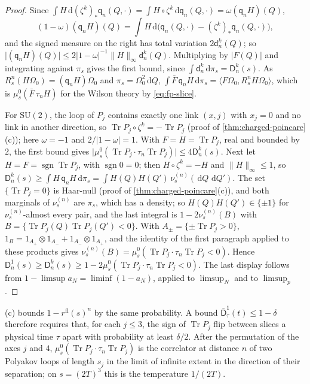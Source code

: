 \documentclass[11pt,a4paper]{amsart}
\theoremstyle{definition}
\theoremstyle{remark}
\numberwithin{equation}{section}
\DeclareMathOperator{\Tr}{Tr}        %
\newcommand{\ip}[2]{\langle #1,#2\rangle}  %
\newcommand{\norm}[1]{\lVert #1\rVert}     %
\newcommand{\abs}[1]{\lvert #1\rvert}      %
\newcommand{\dd}{\,\mathrm{d}}             %
\newcommand{\SU}{\mathrm{SU}}              %
\newcommand{\cube}[1]{(2#1)^3}             %
\newcommand{\Omegazero}{\Omega_0}          %
\begin{document}
\begin{proof}
Since $\int H\dd(\zeta^k)_*\mathsf q_n(Q,\cdot)=\int H\circ\zeta^k\dd\mathsf q_n(Q,\cdot)=\omega(\mathsf q_nH)(Q)$,
\[
(1-\omega)(\mathsf q_nH)(Q)=\int H\dd\bigl(\mathsf q_n(Q,\cdot)-(\zeta^k)_*\mathsf q_n(Q,\cdot)\bigr),
\]
and the signed measure on the right has total variation $2\mathsf d^k_n(Q)$; so $\abs{(\mathsf q_nH)(Q)}\le2\abs{1-\omega}^{-1}\norm H_\infty\mathsf d^k_n(Q)$. Multiplying by $\abs{F(Q)}$ and integrating against $\pi_s$ gives the first bound, since $\int\mathsf d^k_n\dd\pi_s=\mathsf D^k_n(s)$. As $R_s^n(H\Omegazero)=(\mathsf q_nH)\Omegazero$ and $\pi_s=\Omegazero^2\dd Q$, $\int\bar F\,\mathsf q_nH\dd\pi_s=\ip{F\Omegazero}{R_s^nH\Omegazero}$, which is $\mu^0_s(\bar F\,\tau_nH)$ for the Wilson theory by \eqref{eq:fp-slice}.

For $\SU(2)$, the loop of $P_j$ contains exactly one link $(x,j)$ with $x_j=0$ and no link in another direction, so $\Tr P_j\circ\zeta^k=-\Tr P_j$ (proof of \cref{thm:charged-poincare}\textup{(c)}); here $\omega=-1$ and $2/\abs{1-\omega}=1$. With $F=H=\Tr P_j$, real and bounded by $2$, the first bound gives $\abs{\mu^0_s(\Tr P_j\cdot\tau_n\Tr P_j)}\le4\mathsf D^k_n(s)$. Next let $H=F=\operatorname{sgn}\Tr P_j$, with $\operatorname{sgn}0=0$; then $H\circ\zeta^k=-H$ and $\norm H_\infty\le1$, so $\mathsf D^k_n(s)\ge\int H\,\mathsf q_nH\dd\pi_s=\int H(Q)H(Q')\,\nu^{(n)}_s(\dd Q\,\dd Q')$. The set $\{\Tr P_j=0\}$ is Haar-null (proof of \cref{thm:charged-poincare}\textup{(c)}), and both marginals of $\nu^{(n)}_s$ are $\pi_s$, which has a density; so $H(Q)H(Q')\in\{\pm1\}$ for $\nu^{(n)}_s$-almost every pair, and the last integral is $1-2\nu^{(n)}_s(B)$ with $B=\{\Tr P_j(Q)\Tr P_j(Q')<0\}$. With $A_\pm=\{\pm\Tr P_j>0\}$, $1_B=1_{A_+}\otimes1_{A_-}+1_{A_-}\otimes1_{A_+}$, and the identity of the first paragraph applied to these products gives $\nu^{(n)}_s(B)=\mu^0_s(\Tr P_j\cdot\tau_n\Tr P_j<0)$. Hence $\mathsf D^1_n(s)\ge\mathsf D^k_n(s)\ge1-2\mu^0_s(\Tr P_j\cdot\tau_n\Tr P_j<0)$. The last display follows from $1-\limsup a_N=\liminf(1-a_N)$, applied to $\limsup_N$ and to $\limsup_p$.
\end{proof}

\textup{(c)} bounds $1-r^{\mathrm{fl}}(s)^n$ by the same probability. A bound $\bar{\mathsf D}^1_\tau(t)\le1-\delta$ therefore requires that, for each $j\le3$, the sign of $\Tr P_j$ flip between slices a physical time $\tau$ apart with probability at least $\delta/2$. After the permutation of the axes $j$ and $4$, $\mu^0_s(\Tr P_j\cdot\tau_n\Tr P_j)$ is the correlator at distance $n$ of two Polyakov loops of length $s_j$ in the limit of infinite extent in the direction of their separation; on $s=\cube T$ this is the temperature $1/(2T)$.
\end{document}
